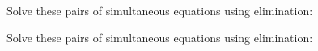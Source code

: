 \documentclass[12pt, a4paper, addpoints]{exam}
\newcommand{\elimination}[6]{%
    \pgfmathsetmacro{\cval}{#3*#1 + #4*#2} %
    \pgfmathsetmacro{\pval}{#5*#1 + #6*#2} %

    \def\formata{%
        \ifnum#3=1
            x
        \else\ifnum#3=-1
            -x
        \else
            \pgfmathprintnumber{#3}x
        \fi\fi}

    \def\formatb{%
        \ifnum#4=1
            +y
        \else\ifnum#4=-1
            -y
        \else
            \ifnum#4<0 \pgfmathprintnumber{#4}y \else +\pgfmathprintnumber{#4}y \fi
        \fi\fi}

    \def\formatd{%
        \ifnum#5=1
            x
        \else\ifnum#5=-1
            -x
        \else
            \pgfmathprintnumber{#5}x
        \fi\fi}

    \def\formate{%
        \ifnum#6=1
            +y
        \else\ifnum#6=-1
            -y
        \else
            \ifnum#6<0 \pgfmathprintnumber{#6}y \else +\pgfmathprintnumber{#6}y \fi
        \fi\fi}

    $\left\{ \begin{aligned}
    \formata \formatb &= \pgfmathprintnumber{\cval} \\[-1pt]
    \formatd \formate &= \pgfmathprintnumber{\pval}
    \end{aligned} \right.$
}
\begin{document}
\begin{questions}
\begin{multicols}{3}
\begin{parts}
\end{parts}
\end{multicols}











\question Solve these pairs of simultaneous equations using elimination:
\begin{multicols}{3} %
\end{multicols}

\question Solve these pairs of simultaneous equations using elimination:
\begin{multicols}{3} %
\end{multicols}
\end{questions}
\end{document}
